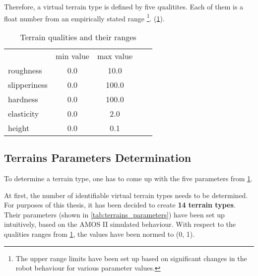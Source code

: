 Therefore, a virtual terrain type is defined by five qualitites. Each of them is a float number from an empirically stated range \footnote{The upper range limits have been set up based on significant changes in the robot behaviour for various parameter values.}. (\cref{tab:terrain_qualities}).

\begin{table}[H]
\centering
\caption{Terrain qualities and their ranges}
\label{tab:terrain_qualities}
\begin{tabular}{lccll}
             & min value & max value \\
roughness    & 0.0       & 10.0      \\
slipperiness & 0.0       & 100.0     \\
hardness     & 0.0       & 100.0     \\
elasticity   & 0.0       & 2.0       \\
height       & 0.0       & 0.1 
\end{tabular}
\end{table}

\subsection{Terrains Parameters Determination} \label{ssec:terrain_parameters}
To determine a terrain type, one has to come up with the five parameters from \cref{tab:terrain_qualities}.

At first, the number of identifiable virtual terrain types needs to be determined. For purposes of this thesis, it has been decided to create \textbf{14 terrain types}. Their parameters (shown in \cref{tab:terrains_parameters}) have been set up intuitively, based on the AMOS II simulated behaviour. With respect to the qualities ranges from \cref{tab:terrain_qualities}, the values have been normed to (0, 1).

